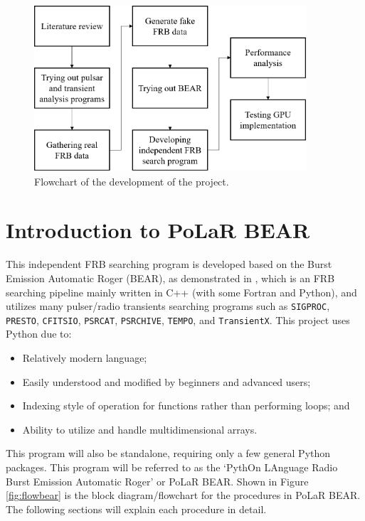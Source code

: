 \begin{figure}[h]
    \vspace{1em}
    \centering
    \includegraphics[width=0.9\textwidth]{Images/flowproj.png}
    \vspace{0.5em}
    \caption{Flowchart of the development of the project.}
    \label{fig:flowproj}
\end{figure}

\section{Introduction to PoLaR BEAR}

This independent FRB searching program is developed based on the Burst Emission Automatic Roger (BEAR), as demonstrated in , which is an FRB searching pipeline mainly written in C++ (with some Fortran and Python), and utilizes many pulser/radio transients searching programs such as \texttt{SIGPROC}, \texttt{PRESTO}, \texttt{CFITSIO}, \texttt{PSRCAT}, \texttt{PSRCHIVE}, \texttt{TEMPO}, and \texttt{TransientX}. This project uses Python due to:
\begin{itemize}
    \item Relatively modern language;
    \item Easily understood and modified by beginners and advanced users;
    \item Indexing style of operation for functions rather than performing loops; and
    \item Ability to utilize and handle multidimensional arrays.
\end{itemize}
This program will also be standalone, requiring only a few general Python packages. This program will be referred to as the `PythOn LAnguage Radio Burst Emission Automatic Roger' or PoLaR BEAR. Shown in Figure \ref{fig:flowbear} is the block diagram/flowchart for the procedures in PoLaR BEAR. The following sections will explain each procedure in detail.

